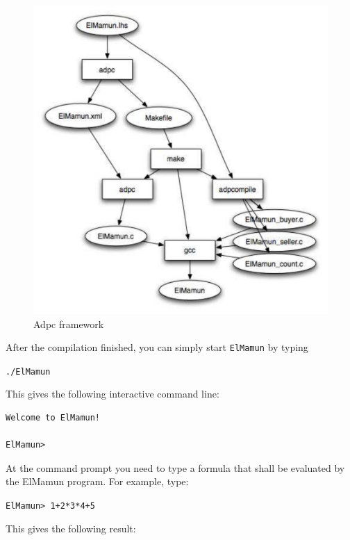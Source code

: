 \documentclass[a4paper]{article}
\begin{document}
\begin{figure}[htbp]
  \centering
  \includegraphics[width=\linewidth]{adpc-framework.pdf}
  \caption{Adpc framework}
  \label{fig:adpc}
\end{figure}

After the compilation finished, you can simply start \texttt{ElMamun}
by typing

\texttt{./ElMamun}

This gives the following interactive command line:

\begin{verbatim}
Welcome to ElMamun!

ElMamun> 
\end{verbatim}

At the command prompt you need to type a formula that shall be
evaluated by the ElMamun program. For example, type:

\texttt{ElMamun> 1+2*3*4+5}

This gives the following result:
\end{document}

